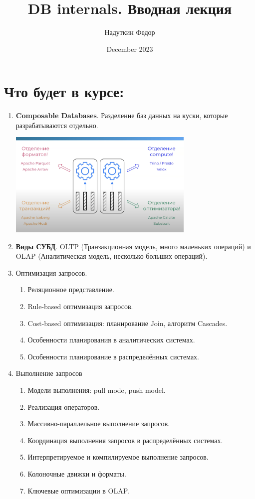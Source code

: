 \documentclass{article}
\title{DB internals. Вводная лекция}
\author{Надуткин Федор }
\date{December 2023}
\begin{document}
\maketitle

\newpage

\section*{Что будет в курсе:}

\begin{enumerate}
    \item \textbf{Composable Databases}.
    Разделение баз данных на куски, которые разрабатываются отдельно.
    
    \includegraphics*[width=0.7\textwidth]{Pictures/Разделение баз данных}

    \item \textbf{Виды СУБД}.
    OLTP (Транзакционная модель, много маленьких операций) и
    OLAP (Аналитическая модель, несколько больших операций).

    \item Оптимизация запросов.
    \begin{enumerate}
        \item Реляционное представление.
        \item Rule-based оптимизация запросов.
        \item Cost-based оптимизация: планирование Join, алгоритм Cascades.
        \item Особенности планирования в аналитических системах.
        \item Особенности планирование в распределённых системах.
    \end{enumerate}

    \item Выполнение запросов
    \begin{enumerate}
        \item Модели выполнения: pull mode, push model.
        \item Реализация операторов.
        \item Массивно-параллельное выполнение запросов.
        \item Координация выполнения запросов в распределённых системах.
        \item Интерпретируемое и компилируемое выполнение запросов.
        \item Колоночные движки и форматы.
        \item Ключевые оптимизации в OLAP.
    \end{enumerate}
\end{enumerate}
\end{document}
